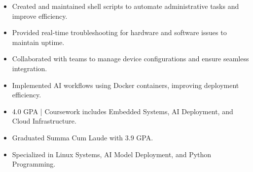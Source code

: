 \par\smallskip
\noindent
\begin{minipage}{20cm}
  \begin{minipage}{9.75cm}
    \begin{itemize}
      \item Created and maintained shell scripts to automate administrative tasks and improve efficiency.
      \item Provided real-time troubleshooting for hardware and software issues to maintain uptime.
    \end{itemize}
  \end{minipage}
  \hfill
  \begin{minipage}{9.75cm}
    \begin{itemize}
      \item Collaborated with teams to manage device configurations and ensure seamless integration.
      \item Implemented AI workflows using Docker containers, improving deployment efficiency.
    \end{itemize}
  \end{minipage}
\end{minipage}
\par\smallskip
\divider

\begin{itemize}
  \item 4.0 GPA | Coursework includes Embedded Systems, AI Deployment, and Cloud Infrastructure.
\end{itemize}
\divider

\begin{itemize}
  \item Graduated Summa Cum Laude with 3.9 GPA.
  \item Specialized in Linux Systems, AI Model Deployment, and Python Programming.
\end{itemize}

\noindent
\begin{minipage}{20cm}
\end{minipage}


